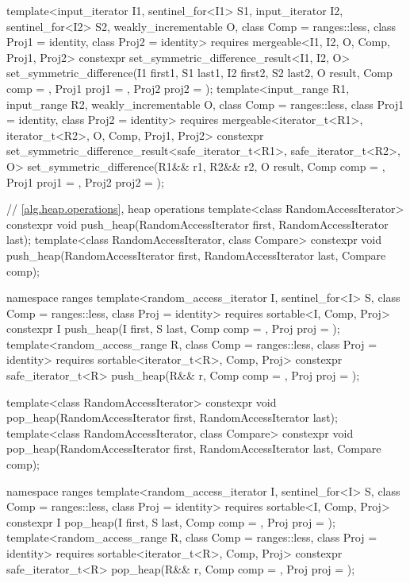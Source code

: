 \begin{codeblock}
{{    template<input_iterator I1, sentinel_for<I1> S1, input_iterator I2, sentinel_for<I2> S2,
             weakly_incrementable O, class Comp = ranges::less,
             class Proj1 = identity, class Proj2 = identity>
      requires mergeable<I1, I2, O, Comp, Proj1, Proj2>
      constexpr set_symmetric_difference_result<I1, I2, O>
        set_symmetric_difference(I1 first1, S1 last1, I2 first2, S2 last2, O result,
                                 Comp comp = {}, Proj1 proj1 = {},
                                 Proj2 proj2 = {});
    template<input_range R1, input_range R2, weakly_incrementable O,
             class Comp = ranges::less, class Proj1 = identity, class Proj2 = identity>
      requires mergeable<iterator_t<R1>, iterator_t<R2>, O, Comp, Proj1, Proj2>
      constexpr set_symmetric_difference_result<safe_iterator_t<R1>, safe_iterator_t<R2>, O>
        set_symmetric_difference(R1&& r1, R2&& r2, O result, Comp comp = {},
                                 Proj1 proj1 = {}, Proj2 proj2 = {});
  }

  // \ref{alg.heap.operations}, heap operations
  template<class RandomAccessIterator>
    constexpr void push_heap(RandomAccessIterator first, RandomAccessIterator last);
  template<class RandomAccessIterator, class Compare>
    constexpr void push_heap(RandomAccessIterator first, RandomAccessIterator last,
                             Compare comp);

  namespace ranges {
    template<random_access_iterator I, sentinel_for<I> S, class Comp = ranges::less,
             class Proj = identity>
      requires sortable<I, Comp, Proj>
      constexpr I
        push_heap(I first, S last, Comp comp = {}, Proj proj = {});
    template<random_access_range R, class Comp = ranges::less, class Proj = identity>
      requires sortable<iterator_t<R>, Comp, Proj>
      constexpr safe_iterator_t<R>
        push_heap(R&& r, Comp comp = {}, Proj proj = {});
  }

  template<class RandomAccessIterator>
    constexpr void pop_heap(RandomAccessIterator first, RandomAccessIterator last);
  template<class RandomAccessIterator, class Compare>
    constexpr void pop_heap(RandomAccessIterator first, RandomAccessIterator last,
                            Compare comp);

  namespace ranges {
    template<random_access_iterator I, sentinel_for<I> S, class Comp = ranges::less,
             class Proj = identity>
      requires sortable<I, Comp, Proj>
      constexpr I
        pop_heap(I first, S last, Comp comp = {}, Proj proj = {});
    template<random_access_range R, class Comp = ranges::less, class Proj = identity>
      requires sortable<iterator_t<R>, Comp, Proj>
      constexpr safe_iterator_t<R>
        pop_heap(R&& r, Comp comp = {}, Proj proj = {});
  }

}
\end{codeblock}
